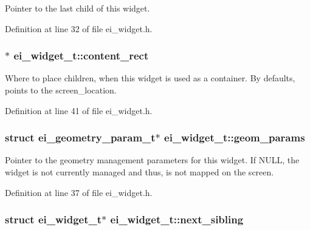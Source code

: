 Pointer to the last child of this widget. 



Definition at line 32 of file ei\-\_\-widget.\-h.

\hypertarget{structei__widget__t_a75c29d388a5f5b32cdd8a9c855bc2a75}{
\subsubsection[{content\-\_\-rect}]{$\ast$ ei\-\_\-widget\-\_\-t\-::content\-\_\-rect}}\label{structei__widget__t_a75c29d388a5f5b32cdd8a9c855bc2a75}


Where to place children, when this widget is used as a container. By defaults, points to the screen\-\_\-location. 



Definition at line 41 of file ei\-\_\-widget.\-h.

\hypertarget{structei__widget__t_a31885277c641803a931fff1d6256203f}{
\subsubsection[{geom\-\_\-params}]{\setlength{\rightskip}{0pt plus 5cm}struct {\bf ei\-\_\-geometry\-\_\-param\-\_\-t}$\ast$ ei\-\_\-widget\-\_\-t\-::geom\-\_\-params}}\label{structei__widget__t_a31885277c641803a931fff1d6256203f}


Pointer to the geometry management parameters for this widget. If N\-U\-L\-L, the widget is not currently managed and thus, is not mapped on the screen. 



Definition at line 37 of file ei\-\_\-widget.\-h.

\hypertarget{structei__widget__t_ada15cedaf8e6e104a1461c1754ff6cb3}{
\subsubsection[{next\-\_\-sibling}]{\setlength{\rightskip}{0pt plus 5cm}struct {\bf ei\-\_\-widget\-\_\-t}$\ast$ ei\-\_\-widget\-\_\-t\-::next\-\_\-sibling}}\label{structei__widget__t_ada15cedaf8e6e104a1461c1754ff6cb3}


